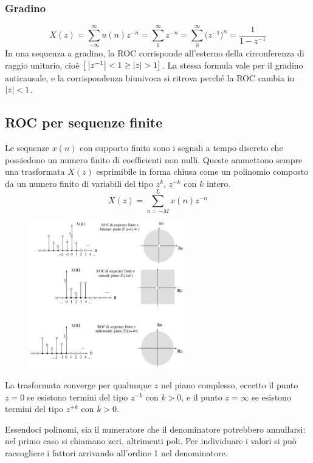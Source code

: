 \subsubsection{Gradino}
$$X(z) = \sum_{-\infty}^{\infty}u(n)z^{-n} = \sum_{0}^{\infty}z^{-n} = \sum_{0}^{\infty}\big(z^{-1}\big)^n = \frac{1}{1 - z^{-1}}$$
In una sequenza a gradino, la ROC corrisponde all'esterno della circonferenza di raggio unitario, cioè $\big[\left|z^{-1}\right| < 1 \geq \left|z\right| > 1\big]$. La stessa formula vale per il gradino anticausale, e la corrispondenza biunivoca si ritrova perché la ROC cambia in $\left|z\right| < 1$.

\subsection{ROC per sequenze finite}
Le sequenze $x(n)$ con supporto finito sono i segnali a tempo discreto che possiedono un numero finito di coefficienti non nulli. Queste ammettono sempre una trasformata $X(z)$ esprimibile in forma chiusa come un polinomio composto da un numero finito di variabili del tipo $z^k$, $z^{-k}$ con $k$ intero.
$$X(z) = \sum_{n=-M}^{L} x(n)z^{-n}$$
\begin{figure}
	\includegraphics[width=0.6\textwidth]{Lezioni/Immagini/roc}
	\vspace{-40pt}
\end{figure}

La trasformata converge per qualunque $z$ nel piano complesso, eccetto il punto $z = 0$ se esistono termini del tipo $z^{-k}$ con $k > 0$, e il punto $z = \infty$ se esistono termini del tipo $z^{+k}$ con $k > 0$.

Essendoci polinomi, sia il numeratore che il denominatore potrebbero annullarsi: nel primo caso si chiamano zeri, altrimenti poli. Per individuare i valori si può raccogliere i fattori arrivando all'ordine 1 nel denominatore.


